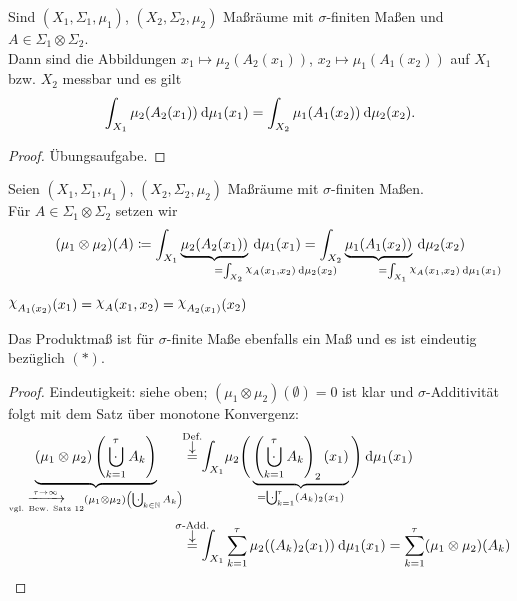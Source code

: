 \documentclass[skript.tex]{subfiles}
\begin{document}
	\begin{theorem}
		Sind $(X_1,\Sigma_1,\mu_1)$, $(X_2,\Sigma_2,\mu_2)$ Maßräume mit $\sigma$-finiten Maßen und $A \in \Sigma_1 \otimes \Sigma_2$. \\
		Dann sind die Abbildungen $x_1 \mapsto \mu_2(A_2(x_1))$, $x_2 \mapsto \mu_1(A_1(x_2))$ auf $X_1$ bzw. $X_2$ messbar und es gilt
		\[
			\int_{X_1} \mu_2(A_2(x_1)) \: \mathrm{d} \mu_1(x_1)
			= \int_{X_2} \mu_1(A_1(x_2)) \: \mathrm{d} \mu_2(x_2).
		\]
	\end{theorem}
	\begin{proof}
		Übungsaufgabe.
	\end{proof}

	\begin{defin}
		Seien $(X_1,\Sigma_1,\mu_1)$, $(X_2,\Sigma_2,\mu_2)$ Maßräume mit $\sigma$-finiten Maßen. \\
		Für $A \in \Sigma_1 \otimes \Sigma_2$ setzen wir
		\[
			(\mu_1 \otimes \mu_2)(A) \coloneqq
			\int_{X_1} \underbrace{\mu_2(A_2(x_1))}_{\mathrlap{
				= \int_{X_2} \rchi_A(x_1,x_2) \md \mu_2(x_2)
			}} \md \mu_1(x_1)
			= \int_{X_2} \underbrace{\mu_1(A_1(x_2))}_{\mathrlap{
					= \int_{X_1} \rchi_A(x_1,x_2) \md \mu_1(x_1)
			}} \md \mu_2(x_2)
		\]
	\end{defin}
	\begin{bem*}
		$\rchi_{A_1(x_2)}(x_1) = \rchi_A(x_1,x_2)= \rchi_{A_2(x_1)}(x_2)$
	\end{bem*}

	\begin{lem}
		Das Produktmaß ist für $\sigma$-finite Maße ebenfalls ein Maß und es ist eindeutig bezüglich $(\ast)$.
	\end{lem}
	\begin{proof}
		Eindeutigkeit: siehe oben; $(\mu_1 \otimes \mu_2)(\emptyset) = 0$ ist klar und $\sigma$-Additivität folgt mit dem Satz über monotone Konvergenz:
		\begin{align*}
			\underbrace{
				(\mu_1 \otimes \mu_2)\left(\bigcupdot_{k=1}^\tau A_k\right)
			}_{\underset{\text{vgl. Bew. Satz 12}}{\xrightarrow{\tau \to\infty}}
				(\mu_1 \otimes \mu_2)\left(\bigcupdot_{k\in\N} A_k\right)
			}
			&\darrow{\text{Def.}}{=}
			\mathlarger\int_{X_1} \mu_2 \Bigg(\underbrace{
				\left(\bigcupdot_{k=1}^\tau A_k\right)_2 (x_1)
			}_{=\bigcupdot_{k=1}^\tau (A_k)_2 (x_1)}
			\Bigg) \md \mu_1(x_1) \\
			&\darrow{\text{$\sigma$-Add.}}{=}
			\mathlarger\int_{X_1}\sum_{k=1}^\tau \mu_2((A_k)_2(x_1)) \md \mu_1(x_1)
			= \sum_{k=1}^\tau (\mu_1\otimes\mu_2)(A_k)
		\end{align*}
	\end{proof}
\end{document}
